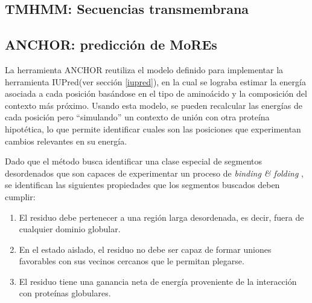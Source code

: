   
  
\subsection{TMHMM: Secuencias transmembrana} \label{tmhmm}




 
 
 
\subsection{ANCHOR: predicción de MoREs} \label{anchor}

La herramienta ANCHOR\cite{meszaros2009prediction} reutiliza el modelo definido para implementar la herramienta IUPred(ver sección \ref{iupred}), en la cual se lograba estimar la energía asociada a cada posición basándose en 
el tipo de aminoácido y la composición del contexto más próximo. Usando esta modelo, se pueden recalcular las energías de cada posición pero ``simulando'' un contexto de unión con otra proteína hipotética, lo que permite
identificar cuales son las posiciones que experimentan cambios relevantes en su energía. 

Dado que el método busca identificar una clase especial de segmentos desordenados que son capaces de experimentar un proceso de \textit{binding \& folding}   , 
se identifican las siguientes propiedades que los segmentos buscados deben cumplir:
\begin{enumerate}
 \item El residuo debe pertenecer a una región larga desordenada, es decir, fuera de cualquier dominio globular.
 \item En el estado aislado, el residuo no debe ser capaz de formar uniones favorables con sus vecinos cercanos que le permitan plegarse.
 \item El residuo tiene una ganancia neta de energía proveniente de la interacción con proteínas globulares.
 \end{enumerate}

